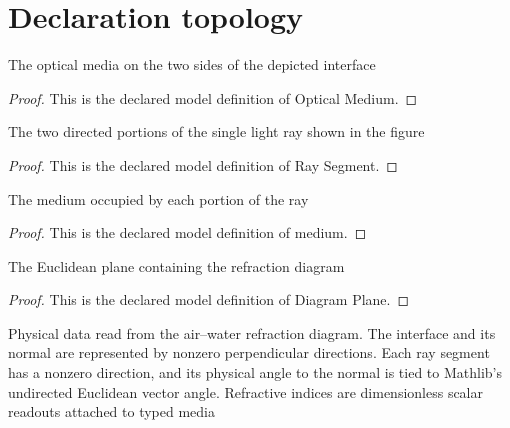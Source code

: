 \section{Declaration topology}
\begin{definition}
  \label{def:physics:phyx-mini-0001:phyxminiproblems-problemphyxmini0001-opticalmedium}
  The optical media on the two sides of the depicted interface
\end{definition}
\begin{proof}
  This is the declared model definition of Optical Medium.
\end{proof}
\begin{definition}
  \label{def:physics:phyx-mini-0001:phyxminiproblems-problemphyxmini0001-raysegment}
  The two directed portions of the single light ray shown in the figure
\end{definition}
\begin{proof}
  This is the declared model definition of Ray Segment.
\end{proof}
\begin{definition}[medium]
  \label{def:physics:phyx-mini-0001:phyxminiproblems-problemphyxmini0001-raysegment-medium}
  The medium occupied by each portion of the ray
\end{definition}
\begin{proof}
  This is the declared model definition of medium.
\end{proof}
\begin{definition}
  \label{def:physics:phyx-mini-0001:phyxminiproblems-problemphyxmini0001-diagramplane}
  The Euclidean plane containing the refraction diagram
\end{definition}
\begin{proof}
  This is the declared model definition of Diagram Plane.
\end{proof}
\begin{definition}
  \label{def:physics:phyx-mini-0001:phyxminiproblems-problemphyxmini0001-airwaterrefractionsetup}
  Physical data read from the air--water refraction diagram. The interface and its normal are represented by nonzero perpendicular directions. Each ray segment has a nonzero direction, and its physical angle to the normal is tied to Mathlib's undirected Euclidean vector angle. Refractive indices are dimensionless scalar readouts attached to typed media
\end{definition}

